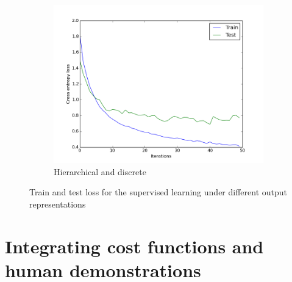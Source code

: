 \documentclass[a4paper,11pt]{report}
\begin{document}
\begin{figure}[t]
    \begin{subfigure}[b]{0.45\columnwidth}
    \includegraphics[clip=true,width=1.\textwidth]{figures/dh_xent.png}
    \caption{Hierarchical and discrete}
    \label{fig:hier_discrete_results}
  \end{subfigure} 

  \caption[SL train test]{Train and test loss for the supervised learning under different output representations}
  \label{fig:SL_results}
\end{figure}





\section{Integrating cost functions and human demonstrations}
\end{document}
